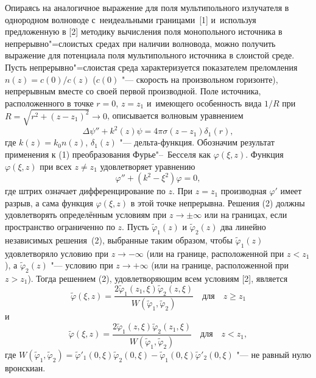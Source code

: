 Опираясь на  аналогичное выражение для поля мультипольного
излучателя в однородном волноводе с~неидеальными границами~[1]
и~используя предложенную в [2] методику вычисления поля
монопольного источника в непрерывно"=слоистых средах при
наличии волновода,  можно получить выражение для потенциала поля
мультипольного источника в слоистой среде.
Пусть непрерывно"=слоистая среда характеризуется показателем
преломления $n(z)=c(0)/c(z)$ ($c(0)$ "--- скорость на произвольном
горизонте), непрерывным вместе со своей первой производной.
Поле источника,  расположенного в точке $r=0$,  $z=z_{1}$ и~имеющего
особенность вида $1/R$ при $R=\sqrt{r^{2}+(z-z_{1})^{2}}\rightarrow
0$,  описывается волновым уравнением
\begin {equation}
\Delta\psi''+k^{2}(z)\psi=4\pi\sigma(z-z_{1})\delta_{1}(r),
\end {equation}
где  $k(z)=k_{0}n(z)$,  $\delta_{1}(z)$  "---  дельта-функция.
Обозначим
результат применения к (1) преобразования Фурье"--~Бесселя
как  $\varphi(\xi, z)$.  Функция $\varphi(\xi, z)$ при всех $z\ne z_1$
удовлетворяет уравнению
\begin {equation}
\varphi''+(k^{2}-\xi^{2})\varphi=0,
\end {equation}
где штрих означает дифференцирование по $z$.
При $z=z_{1}$ производная $\varphi'$ имеет разрыв,  а сама функция $\varphi(\xi, z)$
в этой точке непрерывна.
Решения (2) должны удовлетворять
определённым условиям при $z\rightarrow\pm\infty$ или на границах,
если пространство ограниченно по $z$.
Пусть $\widetilde{\varphi}_{1}(z)$ и $\widetilde{\varphi}_{2}(z)$ два
линейно независимых решения~(2),  выбранные таким образом,  чтобы
$\widetilde{\varphi}_{1}(z)$ удовлетворяло условию при
$z\rightarrow-\infty$ (или на границе,  расположенной при $z<z_{1}$),
а $\widetilde{\varphi}_{2}(z)$ "--- условию при $z\rightarrow+\infty$
(или на границе,  расположенной при $z>z_{1}$). Тогда решением (2),
удовлетворяющим всем условиям [2],  является
$$
\widetilde{\varphi}(\xi, z)=\displaystyle\frac{2\widetilde{\varphi}_{1}(z_{1}, \xi)\widetilde{\varphi}_{2}(z, \xi)}{W(\widetilde{\varphi}_{1}, \widetilde{\varphi}_{2})}\quad \text{для}\quad z\geq z_{1}$$
и
$$\widetilde{\varphi}(\xi, z)=\displaystyle\frac{2\widetilde{\varphi}_{1}(z, \xi)\widetilde{\varphi}_{2}(z_{1}, \xi)}{W(\widetilde{\varphi}_{1}, \widetilde{\varphi}_{2})} \quad \text{для}\quad z<z_{1},$$
где
$W(\widetilde{\varphi}_{1}, \widetilde{\varphi}_{2})=\widetilde{\varphi}'_{1}(0, \xi)\widetilde{\varphi}_{2}(0, \xi)-\widetilde{\varphi}_{1}(0, \xi)\widetilde{\varphi}'_{2}(0, \xi)$
 "---  не равный нулю вронскиан.
